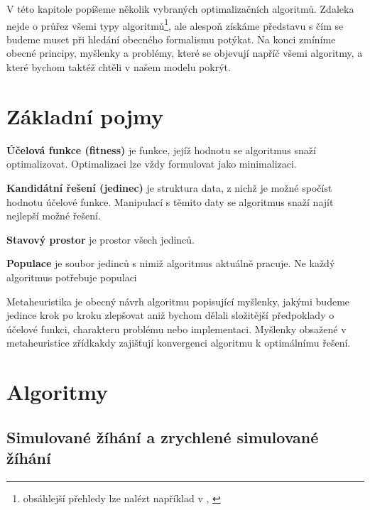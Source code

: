 
V této kapitole popíšeme několik vybraných optimalizačních algoritmů. Zdaleka nejde o průřez všemi typy algoritmů\footnote{obsáhlejší přehledy lze nalézt například v \cite[p.~23]{GO ebook}, \cite{wiki metaheur}}, ale alespoň získáme představu s čím se budeme muset při hledání obecného formalismu potýkat. Na konci zmíníme obecné principy, myšlenky a problémy, které se objevují napříč všemi algoritmy, a které bychom taktéž chtěli v našem modelu pokrýt.

\section{Základní pojmy}

\par{\textbf{Účelová funkce (fitness)} je funkce, jejíž hodnotu se algoritmus snaží optimalizovat. Optimalizaci lze vždy formulovat jako minimalizaci.}

\par{\textbf{Kandidátní řešení (jedinec)} je struktura data, z nichž je možné spočíst hodnotu účelové funkce. Manipulací s těmito daty se algoritmus snaží najít nejlepší možné řešení.}

\par{\textbf{Stavový prostor} je prostor všech jedinců.}

\par{\textbf{Populace} je soubor jedinců s nimiž algoritmus aktuálně pracuje. Ne každý algoritmus potřebuje populaci}

\par{Metaheuristika je obecný návrh algoritmu popisující myšlenky, jakými budeme jedince krok po kroku zlepšovat aniž bychom dělali složitější předpoklady o účelové funkci, charakteru problému nebo implementaci. Myšlenky obsažené v metaheuristice zřídkakdy zajišťují konvergenci algoritmu k optimálnímu řešení.}

\section{Algoritmy}


\subsection{Simulované žíhání a zrychlené simulované žíhání}

